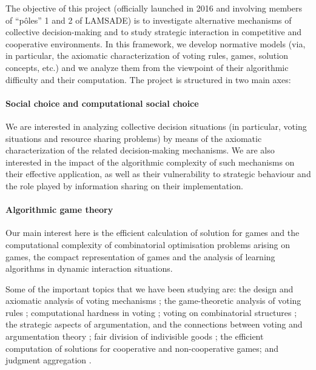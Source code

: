 The objective of this project (officially launched in 2016 and involving members of ``p\^oles'' 1 and 2 of LAMSADE) is to investigate alternative mechanisms of collective decision-making and to study strategic interaction in competitive and cooperative environments. In this framework, we develop normative models (via, in particular, the axiomatic characterization of voting rules, games, solution concepts, etc.) and we analyze them from the viewpoint of their algorithmic difficulty and their computation. 
The project is structured in two main axes:

\paragraph{Social choice and computational social choice} We are interested in analyzing collective decision situations (in particular, voting situations and resource sharing problems) by means of the axiomatic characterization of the related decision-making mechanisms. We are also interested in the impact of the algorithmic complexity of such mechanisms on their effective application, as well as their vulnerability to strategic behaviour and the role played by information sharing on their implementation. 

\paragraph{Algorithmic game theory} Our main interest here is the efficient calculation of solution for games and the computational complexity of combinatorial optimisation problems arising on games, the compact representation of games and the analysis of learning algorithms in dynamic interaction situations.  \medskip
  

Some of the important topics that we have been studying are:  the design and axiomatic analysis of voting mechanisms \cite{BL2014a, Nunez2017Revisiting-1232049}; the game-theoretic analysis of voting rules \cite{Nunez2015Electoral-1159349}; computational hardness in voting \cite{Cornaz2013Kemeny-1052539, DBLP:conf/ijcai/FaliszewskiGLLM16}; voting on combinatorial structures \cite{DBLP:conf/ijcai/BarrotL16}; the strategic aspects of argumentation, and the connections between voting and argumentation theory \cite{Cailloux2016Arguing-1097261, PigozziPareto-1326421}; fair division of indivisible goods \cite{DBLP:books/sp/16/LangR16, Gourves2015Worst-1204664};  the efficient computation of solutions for cooperative \cite{cesari2016generalized} and non-cooperative \cite{Gourves2012Congestion-624993} games; and judgment aggregation \cite{LangPSTV2017}.


